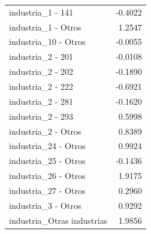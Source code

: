 \begin{tabular}{lr}
industria_1 - 141 & -0.4022 \\
industria_1 - Otros & 1.2547 \\
industria_10 - Otros & -0.0055 \\
industria_2 - 201 & -0.0108 \\
industria_2 - 202 & -0.1890 \\
industria_2 - 222 & -0.6921 \\
industria_2 - 281 & -0.1620 \\
industria_2 - 293 & 0.5998 \\
industria_2 - Otros & 0.8389 \\
industria_24 - Otros & 0.9924 \\
industria_25 - Otros & -0.1436 \\
industria_26 - Otros & 1.9175 \\
industria_27 - Otros & 0.2960 \\
industria_3 - Otros & 0.9292 \\
industria_Otras industrias & 1.9856 \\
\bottomrule
\end{tabular}
